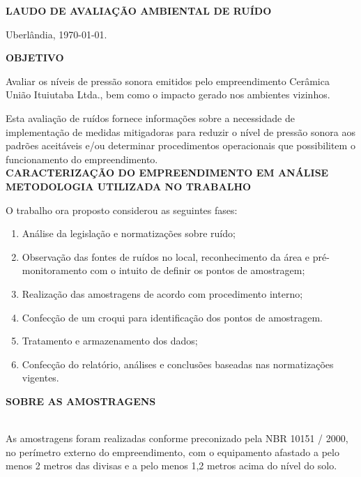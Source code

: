 
\newpage
\begin{SingleSpace}
\textbf{LAUDO DE AVALIAÇÃO AMBIENTAL DE RUÍDO}

\begin{flushright}
Uberlândia, \today .
\end{flushright}

\textbf{OBJETIVO}

Avaliar os níveis de pressão sonora emitidos pelo empreendimento Cerâmica União Ituiutaba Ltda., bem como o impacto gerado nos ambientes vizinhos.

Esta avaliação de ruídos fornece informações sobre a necessidade de implementação de medidas mitigadoras para reduzir o nível de pressão sonora aos padrões aceitáveis e/ou determinar procedimentos operacionais que possibilitem o funcionamento do empreendimento. \\

\textbf{CARACTERIZAÇÃO DO EMPREENDIMENTO EM ANÁLISE} \\	


\textbf{METODOLOGIA UTILIZADA NO TRABALHO}

O trabalho ora proposto considerou as seguintes fases:

\begin{enumerate}
\item Análise da legislação e normatizações sobre ruído;
\item Observação das fontes de ruídos no local, reconhecimento da área e pré-monitoramento com o intuito de definir os pontos de amostragem;
\item Realização das amostragens de acordo com procedimento interno;
\item Confecção de um croqui para identificação dos pontos de amostragem.
\item Tratamento e armazenamento dos dados;
\item Confecção do relatório, análises e conclusões baseadas nas normatizações vigentes.
\end{enumerate}

\textbf{SOBRE AS AMOSTRAGENS}
 \\

As amostragens foram realizadas conforme preconizado pela NBR 10151 / 2000, no perímetro externo do empreendimento, com o equipamento afastado a pelo menos 2 metros das divisas e a pelo menos 1,2 metros acima do nível do solo.


\end{SingleSpace}

